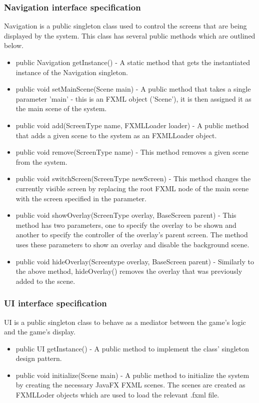     	\subsubsection{Navigation interface specification}
        	Navigation is a public singleton class used to control the screens that are being displayed by the system. This class has several public methods which are outlined below.
            \begin{itemize}
            	\item public Navigation getInstance() - A static method that gets the instantiated instance of the Navigation singleton.
                \item public void setMainScene(Scene main) - A public method that takes a single parameter 'main' - this is an FXML object ('Scene'), it is then assigned it as the main scene of the system.
                \item public void add(ScreenType name, FXMLLoader loader) - A public method that adds a given scene to the system as an FXMLLoader object.
                \item public void remove(ScreenType name) - This method removes a given scene from the system.
                \item public void switchScreen(ScreenType newScreen) - This method changes the currently visible screen by replacing the root FXML node of the main scene with the screen specified in the parameter.
                \item public void showOverlay(ScreenType overlay, BaseScreen parent) - This method has two parameters, one to specify the overlay to be shown and another to specify the controller of the overlay's parent screen. The method uses these parameters to show an overlay and disable the background scene.
                \item public void hideOverlay(Screentype overlay, BaseScreen parent) - Similarly to the above method, hideOverlay() removes the overlay that was previously added to the scene.
            \end{itemize}
            
        \subsubsection{UI interface specification}
        	UI is a public singleton class to behave as a mediator between the game's logic and the game's display.
            \begin{itemize}
            	\item public UI getInstance() - A public method to implement the class' singleton design pattern.
                \item public void initialize(Scene main) - A public method to initialize the system by creating the necessary JavaFX FXML scenes. The scenes are created as FXMLLoder objects which are used to load the relevant .fxml file.
            \end{itemize}
            
